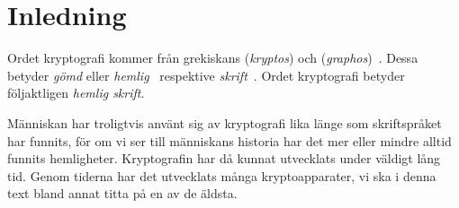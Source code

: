 \section{Inledning}
\label{sec:Inledning}
Ordet kryptografi kommer från grekiskans  (\emph{kryptos}) och 
 (\emph{graphos})~\cite{OED2013cg}.
Dessa betyder \emph{gömd} eller \emph{hemlig}~\cite{OED2013c} respektive 
\emph{skrift}~\cite{OED2013g}.
Ordet kryptografi betyder följaktligen \emph{hemlig skrift}.

Människan har troligtvis använt sig av kryptografi lika länge som skriftspråket 
har funnits, för om vi ser till människans historia har det mer eller mindre 
alltid funnits hemligheter.
Kryptografin har då kunnat utvecklats under väldigt lång tid.
Genom tiderna har det utvecklats många kryptoapparater, vi ska i denna text 
bland annat titta på en av de äldsta.

